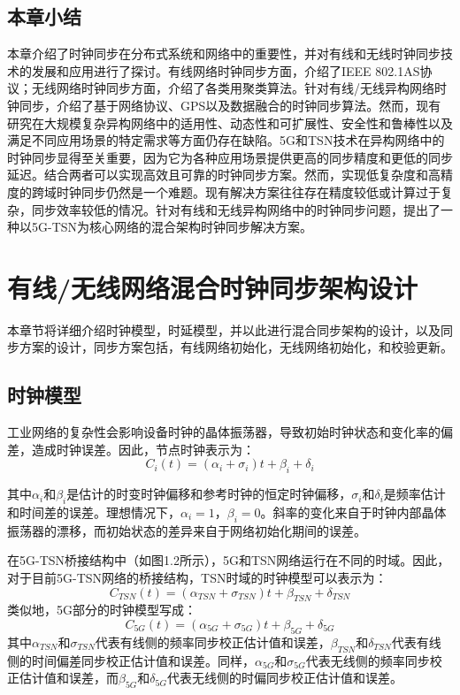 \documentclass[UTF8,a4paper,12pt]{ctexart}
\numberwithin{equation}{section}
\begin{document}
\subsection{本章小结}
本章介绍了时钟同步在分布式系统和网络中的重要性，并对有线和无线时钟同步技术的发展和应用进行了探讨。有线网络时钟同步方面，介绍了IEEE 802.1AS协议；无线网络时钟同步方面，介绍了各类用聚类算法。针对有线/无线异构网络时钟同步，介绍了基于网络协议、GPS以及数据融合的时钟同步算法。然而，现有研究在大规模复杂异构网络中的适用性、动态性和可扩展性、安全性和鲁棒性以及满足不同应用场景的特定需求等方面仍存在缺陷。5G和TSN技术在异构网络中的时钟同步显得至关重要，因为它为各种应用场景提供更高的同步精度和更低的同步延迟。结合两者可以实现高效且可靠的时钟同步方案。然而，实现低复杂度和高精度的跨域时钟同步仍然是一个难题。现有解决方案往往存在精度较低或计算过于复杂，同步效率较低的情况。针对有线和无线异构网络中的时钟同步问题，提出了一种以5G-TSN为核心网络的混合架构时钟同步解决方案。

\newpage
{}
\section{有线/无线网络混合时钟同步架构设计}

本章节将详细介绍时钟模型，时延模型，并以此进行混合同步架构的设计，以及同步方案的设计，同步方案包括，有线网络初始化，无线网络初始化，和校验更新。

\subsection{时钟模型}
工业网络的复杂性会影响设备时钟的晶体振荡器，导致初始时钟状态和变化率的偏差，造成时钟误差。因此，节点时钟表示为：
\begin{equation}
	C_i(t) = (\alpha _i+\sigma_i)t + \beta _i +\delta_i
\end{equation}

其中$\alpha_i$和$\beta_i$是估计的时变时钟偏移和参考时钟的恒定时钟偏移，$\sigma_i$和$\delta_i$是频率估计和时间差的误差。理想情况下，$\alpha_i = 1$，$\beta_i = 0$。斜率的变化来自于时钟内部晶体振荡器的漂移，而初始状态的差异来自于网络初始化期间的误差。

在5G-TSN桥接结构中（如图1.2所示），5G和TSN网络运行在不同的时域。因此，对于目前5G-TSN网络的桥接结构，TSN时域的时钟模型可以表示为：
\begin{equation}
	C_{TSN}(t) = (\alpha_{TSN}+\sigma_{TSN})t + \beta _{TSN} +\delta_{TSN}
\end{equation}
类似地，5G部分的时钟模型写成：
\begin{equation}
	C_{5G}(t) = (\alpha_{5G}+\sigma_{5G})t + \beta _{5G} +\delta_{5G}
\end{equation}
其中$\alpha_{TSN}$和$\sigma_{TSN}$代表有线侧的频率同步校正估计值和误差，$\beta_{TSN}$和$\delta_{TSN}$代表有线侧的时间偏差同步校正估计值和误差。同样，$\alpha_{5G}$和$\sigma_{5G}$代表无线侧的频率同步校正估计值和误差，而$\beta_{5G}$和$\delta_{5G}$代表无线侧的时偏同步校正估计值和误差。
\end{document}
